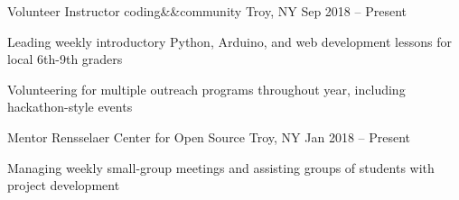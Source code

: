 


\begin{cventries}

  \cventry
  {Volunteer Instructor}
  {coding\&\&community}
  {Troy, NY}
  {Sep 2018 -- Present}
  {
    \begin{cvitems}
      \item {Leading weekly introductory Python, Arduino, and web development lessons for local 6th-9th graders}
      \item {Volunteering for multiple outreach programs throughout year, including hackathon-style events}
    \end{cvitems}
  }


  \cventry
  {Mentor}
  {Rensselaer Center for Open Source}
  {Troy, NY}
  {Jan 2018 -- Present}
  {
    \begin{cvitems}
      \item {Managing weekly small-group meetings and assisting groups of students with project development}
    \end{cvitems}
  }



\end{cventries}
